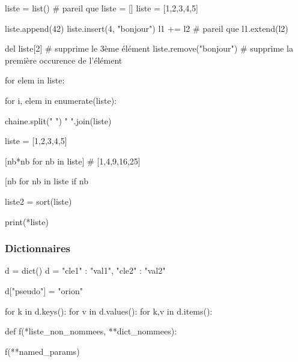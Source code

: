 \documentclass{beamer}
\let\oldsubsubsection\subsubsection
\renewcommand{\subsubsection}[2][]{\def\currentsubsubsection{#2}\oldsubsubsection[#1]{#2}}
\begin{document}
\begin{code}{\codeboxa}
liste = list() # pareil que liste = []
liste = [1,2,3,4,5]

liste.append(42)
liste.insert(4, "bonjour")
l1 += l2 # pareil que l1.extend(l2)
  
del liste[2] # supprime le 3ème élément
liste.remove("bonjour")
# supprime la première occurence de l'élément
\end{code}
\begin{code}{\codeboxb}
for elem in liste:
  
for i, elem in enumerate(liste):
  
chaine.split(" ")
" ".join(liste)
\end{code}
\begin{code}{\codeboxc}
liste = [1,2,3,4,5]
  
[nb*nb for nb in liste] # [1,4,9,16,25]
  
[nb for nb in liste if nb%
  
liste2 = sort(liste)
  
print(*liste)
\end{code}
\begin{frame}
  \begin{overprint}
    \usebox\codeboxa
    \usebox\codeboxb
    \usebox\codeboxc
  \end{overprint}
\end{frame}

\subsubsection{Dictionnaires}
\begin{code}{\codebox}
d = dict()
d = {"cle1" : "val1", "cle2" : "val2"}
  
d["pseudo"] = "orion"

for k in d.keys():
for v in d.values():
for k,v in d.items():

def f(*liste_non_nommees, **dict_nommees):

f(**named_params)
\end{code}
\begin{frame}
  \usebox\codebox
\end{frame}
\end{document}

